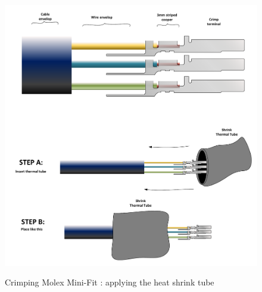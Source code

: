 \begin{figure}
  \centering
  \includegraphics[angle=90,width=1\columnwidth]{figs/body03/FIGCRIMP7.pdf}\\
  \caption[Crimping Molex Mini-Fit \textregistered: applying the heat shrink tube]{Crimping Molex Mini-Fit \textregistered: applying the heat shrink tube}
  \label{FIG:CRIMP7}
\end{figure}
